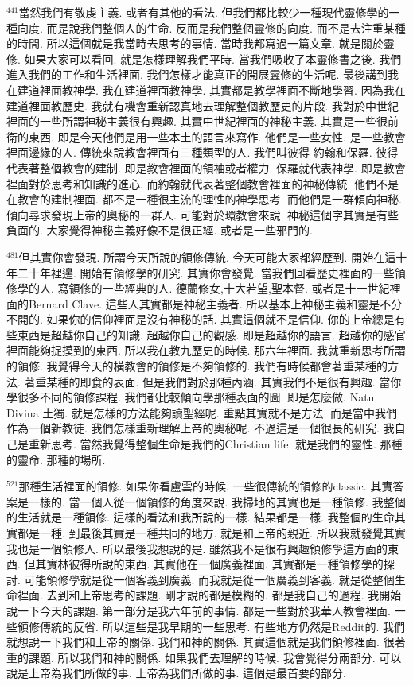 \documentclass{book}
\begin{document}
$^{441}$當然我們有敬虔主義.
或者有其他的看法.
但我們都比較少一種現代靈修學的一種向度.
而是說我們整個人的生命.
反而是我們整個靈修的向度.
而不是去注重某種的時間.
所以這個就是我當時去思考的事情.
當時我都寫過一篇文章.
就是關於靈修.
如果大家可以看回.
就是怎樣理解我們平時.
當我們吸收了本靈修書之後.
我們進入我們的工作和生活裡面.
我們怎樣才能真正的開展靈修的生活呢.
最後講到我在建道裡面教神學.
我在建道裡面教神學.
其實都是教學裡面不斷地學習.
因為我在建道裡面教歷史.
我就有機會重新認真地去理解整個教歷史的片段.
我對於中世紀裡面的一些所謂神秘主義很有興趣.
其實中世紀裡面的神秘主義.
其實是一些很前衛的東西.
即是今天他們是用一些本土的語言來寫作.
他們是一些女性.
是一些教會裡面邊緣的人.
傳統來說教會裡面有三種類型的人.
我們叫彼得 約翰和保羅.
彼得代表著整個教會的建制.
即是教會裡面的領袖或者權力.
保羅就代表神學.
即是教會裡面對於思考和知識的進心.
而約翰就代表著整個教會裡面的神秘傳統.
他們不是在教會的建制裡面.
都不是一種很主流的理性的神學思考.
而他們是一群傾向神秘.
傾向尋求發現上帝的奧秘的一群人.
可能對於環教會來說.
神秘這個字其實是有些負面的.
大家覺得神秘主義好像不是很正經.
或者是一些邪門的.

$^{481}$但其實你會發現.
所謂今天所說的領修傳統.
今天可能大家都經歷到.
開始在這十年二十年裡邊.
開始有領修學的研究.
其實你會發覺.
當我們回看歷史裡面的一些領修學的人.
寫領修的一些經典的人.
德蘭修女,十大若望,聖本督.
或者是十一世紀裡面的Bernard Clave.
這些人其實都是神秘主義者.
所以基本上神秘主義和靈是不分不開的.
如果你的信仰裡面是沒有神秘的話.
其實這個就不是信仰.
你的上帝總是有些東西是超越你自己的知識.
超越你自己的觀感.
即是超越你的語言.
超越你的感官裡面能夠捉摸到的東西.
所以我在教九歷史的時候.
那六年裡面.
我就重新思考所謂的領修.
我覺得今天的橫教會的領修是不夠領修的.
我們有時候都會著重某種的方法.
著重某種的即食的表面.
但是我們對於那種內涵.
其實我們不是很有興趣.
當你學很多不同的領修課程.
我們都比較傾向學那種表面的圖.
即是怎麼做.
Natu Divina 土獨.
就是怎樣的方法能夠讀聖經呢.
重點其實就不是方法.
而是當中我們作為一個新教徒.
我們怎樣重新理解上帝的奧秘呢.
不過這是一個很長的研究.
我自己是重新思考.
當然我覺得整個生命是我們的Christian life.
就是我們的靈性.
那種的靈命.
那種的場所.

$^{521}$那種生活裡面的領修.
如果你看盧雲的時候.
一些很傳統的領修的classic.
其實答案是一樣的.
當一個人從一個領修的角度來說.
我掃地的其實也是一種領修.
我整個的生活就是一種領修.
這樣的看法和我所說的一樣.
結果都是一樣.
我整個的生命其實都是一種.
到最後其實是一種共同的地方.
就是和上帝的親近.
所以我就發覺其實我也是一個領修人.
所以最後我想說的是.
雖然我不是很有興趣領修學這方面的東西.
但其實林彼得所說的東西.
其實他在一個廣義裡面.
其實都是一種領修學的探討.
可能領修學就是從一個客義到廣義.
而我就是從一個廣義到客義.
就是從整個生命裡面.
去到和上帝思考的課題.
剛才說的都是模糊的.
都是我自己的過程.
我開始說一下今天的課題.
第一部分是我六年前的事情.
都是一些對於我華人教會裡面.
一些領修傳統的反省.
所以這些是我早期的一些思考.
有些地方仍然是Reddit的.
我們就想說一下我們和上帝的關係.
我們和神的關係.
其實這個就是我們領修裡面.
很著重的課題.
所以我們和神的關係.
如果我們去理解的時候.
我會覺得分兩部分.
可以說是上帝為我們所做的事.
上帝為我們所做的事.
這個是最首要的部分.
\end{document}
